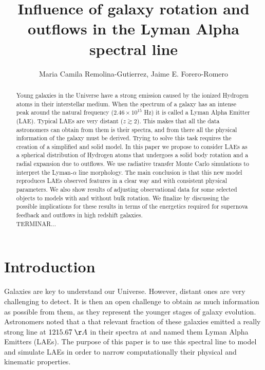 \documentclass[twocolappendix]{latex/emulateapj}
\begin{document}
\title{Influence of galaxy rotation and outflows in the Lyman Alpha spectral line}


\author{Maria Camila Remolina-Gutierrez, Jaime E. Forero-Romero} 


\begin{abstract}
\noindent Young galaxies in the Universe have a strong \lya emission caused by the ionized Hydrogen atoms in their interstellar medium. When the spectrum of a galaxy has an intense peak around the \lya natural frequency ($2.46\times 10^{15}$ Hz) it is called a Lyman Alpha Emitter (LAE). Typical LAEs are very distant ($z \gtrsim 2$). This makes that all the data astronomers can obtain from them is their spectra, and from there all the physical information of the galaxy must be derived. Trying to solve this task requires the creation of a simplified and solid model. In this paper we propose to consider LAEs as a spherical distribution of Hydrogen atoms that undergoes a solid body rotation and a radial expansion due to outflows. We use radiative transfer Monte Carlo simulations to interpret the Lyman-$\alpha$ line morphology. The main conclusion is that this new model reproduces LAEs observed features in a clear way and with consistent physical parameters. We also show results of adjusting observational data for some selected objects to models with and without bulk rotation. We finalize by discussing the possible implications for these results in terms of the energetics required for supernova feedback and outflows in high redshift galaxies. \\

TERMINAR...\\
\end{abstract}

\section{Introduction}
\label{sec:intro}

Galaxies are key to understand our Universe. However, distant ones are very challenging to detect. It is then an open challenge to obtain as much information as possible from them, as they represent the younger stages of galaxy evolution. Astronomers noted that a that relevant fraction of these galaxies emitted a really strong line at $1215.67\;\AA$ in their spectra at  and named them Lyman Alpha Emitters (LAEs). The purpose of this paper is to use this spectral line to model and simulate LAEs in order to narrow computationally their physical and kinematic properties. \\
\end{document}
